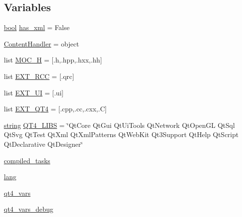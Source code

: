 \subsection*{Variables}
\begin{DoxyCompactItemize}
\item 
\hyperlink{mac_2config_2i386_2lib-src_2libsoxr_2soxr-config_8h_abb452686968e48b67397da5f97445f5b}{bool} \hyperlink{namespacewaflib_1_1_tools_1_1qt4_ab8c194042f1234950ed5a34031af55f4}{has\+\_\+xml} = False
\item 
\hyperlink{namespacewaflib_1_1_tools_1_1qt4_a5275b334927657caa38f9c801f034dcd}{Content\+Handler} = object
\item 
list \hyperlink{namespacewaflib_1_1_tools_1_1qt4_abca604c664ad1bad3587166900f67980}{M\+O\+C\+\_\+H} = \mbox{[}\textquotesingle{}.h\textquotesingle{},\textquotesingle{}.hpp\textquotesingle{},\textquotesingle{}.hxx\textquotesingle{},\textquotesingle{}.hh\textquotesingle{}\mbox{]}
\item 
list \hyperlink{namespacewaflib_1_1_tools_1_1qt4_ac4474e94f00290725e850706f367fd1b}{E\+X\+T\+\_\+\+R\+CC} = \mbox{[}\textquotesingle{}.qrc\textquotesingle{}\mbox{]}
\item 
list \hyperlink{namespacewaflib_1_1_tools_1_1qt4_a33aa391e566ecb7090c9230378ce48d5}{E\+X\+T\+\_\+\+UI} = \mbox{[}\textquotesingle{}.ui\textquotesingle{}\mbox{]}
\item 
list \hyperlink{namespacewaflib_1_1_tools_1_1qt4_abdcf03052c5abde65d1eca6f7e766345}{E\+X\+T\+\_\+\+Q\+T4} = \mbox{[}\textquotesingle{}.cpp\textquotesingle{},\textquotesingle{}.cc\textquotesingle{},\textquotesingle{}.cxx\textquotesingle{},\textquotesingle{}.C\textquotesingle{}\mbox{]}
\item 
\hyperlink{test__lib_f_l_a_c_2format_8c_ab02026ad0de9fb6c1b4233deb0a00c75}{string} \hyperlink{namespacewaflib_1_1_tools_1_1qt4_ac13f7adabbf71627a6f890c063bbf37c}{Q\+T4\+\_\+\+L\+I\+BS} = \char`\"{}Qt\+Core Qt\+Gui Qt\+Ui\+Tools Qt\+Network Qt\+Open\+GL Qt\+Sql Qt\+Svg Qt\+Test Qt\+Xml Qt\+Xml\+Patterns Qt\+Web\+Kit Qt3\+Support Qt\+Help Qt\+Script Qt\+Declarative Qt\+Designer\char`\"{}
\item 
\hyperlink{namespacewaflib_1_1_tools_1_1qt4_a4de6dd7d55db0ae296daea36a22f509c}{compiled\+\_\+tasks}
\item 
\hyperlink{namespacewaflib_1_1_tools_1_1qt4_a1410657c327d97e1b283cb08a32121f4}{lang}
\item 
\hyperlink{namespacewaflib_1_1_tools_1_1qt4_a8fd63057f4dbeb4a6ad456a4586e6b9c}{qt4\+\_\+vars}
\item 
\hyperlink{namespacewaflib_1_1_tools_1_1qt4_a7e80b38df8e0bdcbb19c7212ad747ff1}{qt4\+\_\+vars\+\_\+debug}
\end{DoxyCompactItemize}


